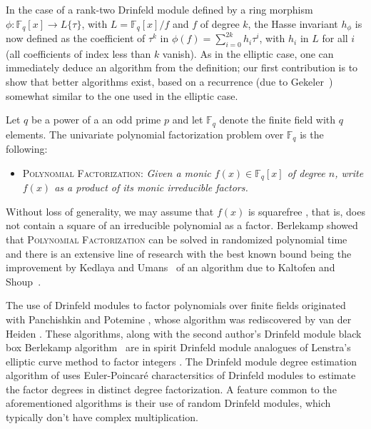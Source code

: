 \documentclass[12pt]{article}
\theoremstyle{plain}
\theoremstyle{definition}
\newcommand{\ang}[1]{\{#1\}}
\def\F{\ensuremath{\mathbb{F}}}
\begin{document}
In the case of a rank-two Drinfeld module defined by a ring morphism
$\phi: \F_q[x] \to L\ang{\tau}$, with $L=\F_q[x]/f$ and $f$ of degree
$k$, the Hasse invariant $h_\phi$ is now defined as the coefficient of
$\tau^k$ in $\phi(f) =\sum_{i=0}^{2k} h_i \tau^i$, with $h_i$ in $L$
for all $i$ (all coefficients of index less than $k$ vanish).  As in
the elliptic case, one can immediately deduce an algorithm from the
definition; our first contribution is to show that better algorithms
exist, based on a recurrence (due to Gekeler~\cite{gek}) somewhat 
similar to the one used in the elliptic case.



Let $q$ be a power of a an odd prime $p$ and let $\F_q$ denote the
finite field with $q$ elements.  The univariate polynomial
factorization problem over $\F_q$ is the following:
\begin{itemize}
 \item \textsc{Polynomial Factorization:} \textit{Given a monic $f(x) \in \mathbb{F}_q[x]$ of 
 degree $n$, write $f(x)$ as a product of its monic irreducible factors.}
\end{itemize}


Without loss of generality, we may assume that $f(x)$ is squarefree
\cite{knu,yun}, that is, does not contain a square of an irreducible
polynomial as a factor. Berlekamp showed that \textsc{Polynomial
  Factorization} can be solved in randomized polynomial time
\cite{ber} and there is an extensive line of research
\cite{cz,gs} with the best known bound being the improvement by
Kedlaya and Umans~\cite{ku} of an algorithm due to Kaltofen and
Shoup~\cite{ks}.


The use of Drinfeld modules to factor polynomials over finite fields
originated with Panchishkin and Potemine \cite{pp}, whose algorithm
was rediscovered by van der Heiden \cite{vdH}. These algorithms, along
with the second author's Drinfeld module black box Berlekamp
algorithm~\cite{nar} are in spirit Drinfeld module analogues of
Lenstra's elliptic curve method to factor integers \cite{len}. The
Drinfeld module degree estimation algorithm of \cite{nar} uses
Euler-Poincar\'e charactersitics of Drinfeld modules to estimate the
factor degrees in distinct degree factorization. A feature common to
the aforementioned algorithms is their use of random Drinfeld
modules, which typically don't have complex multiplication. 
\end{document}
